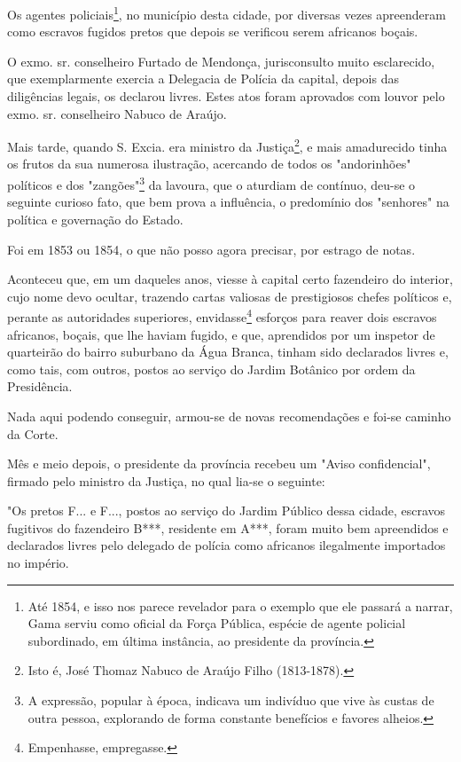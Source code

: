 Os agentes policiais\footnote{Até 1854, e isso nos parece revelador
  para o exemplo que ele passará a narrar, Gama serviu como oficial da
  Força Pública, espécie de agente policial subordinado, em última
  instância, ao presidente da província.}, no município desta cidade,
por diversas vezes apreenderam como escravos fugidos pretos que depois
se verificou serem africanos boçais.

O exmo. sr. conselheiro Furtado de Mendonça, jurisconsulto muito
esclarecido, que exemplarmente exercia a Delegacia de Polícia da
capital, depois das diligências legais, os declarou livres. Estes atos
foram aprovados com louvor pelo exmo. sr. conselheiro Nabuco de Araújo.

Mais tarde, quando S. Excia. era ministro da Justiça\footnote{Isto é,
  José Thomaz Nabuco de Araújo Filho (1813-1878).}, e mais amadurecido
tinha os frutos da sua numerosa ilustração, acercando de todos os
"andorinhões" políticos e dos "zangões"\footnote{A expressão, popular
  à época, indicava um indivíduo que vive às custas de outra pessoa,
  explorando de forma constante benefícios e favores alheios.} da
lavoura, que o aturdiam de contínuo, deu-se o seguinte curioso fato, que
bem prova a influência, o predomínio dos "senhores" na política e
governação do Estado.

Foi em 1853 ou 1854, o que não posso agora precisar, por estrago de
notas.

Aconteceu que, em um daqueles anos, viesse à capital certo fazendeiro do
interior, cujo nome devo ocultar, trazendo cartas valiosas de
prestigiosos chefes políticos e, perante as autoridades superiores,
envidasse\footnote{Empenhasse, empregasse.} esforços para reaver dois
escravos africanos, boçais, que lhe haviam fugido, e que, aprendidos por
um inspetor de quarteirão do bairro suburbano da Água Branca, tinham
sido declarados livres e, como tais, com outros, postos ao serviço do
Jardim Botânico por ordem da Presidência.

Nada aqui podendo conseguir, armou-se de novas recomendações e foi-se
caminho da Corte.

Mês e meio depois, o presidente da província recebeu um "Aviso
confidencial", firmado pelo ministro da Justiça, no qual lia-se o
seguinte:

"Os pretos F... e F..., postos ao serviço do Jardim Público dessa
cidade, escravos fugitivos do fazendeiro B***, residente em A***, foram
muito bem apreendidos e declarados livres pelo delegado de polícia como
africanos ilegalmente importados no império.

